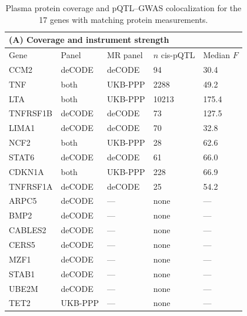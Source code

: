 \begin{table}[htbp]
\centering
\caption{Plasma protein coverage and pQTL--GWAS colocalization for the 17 genes with matching protein measurements.}
\label{tab:pqtl_coverage}
\footnotesize
\begin{tabular}{lllll}
\toprule
\multicolumn{5}{l}{\textbf{(A)} Coverage and instrument strength}\\
\midrule
  Gene & Panel & MR panel & $n$ cis-pQTL & Median $F$ \\
\midrule
  CCM2      & deCODE & deCODE   & 94    & 30.4 \\
  TNF       & both   & UKB-PPP  & 2288  & 49.2 \\
  LTA       & both   & UKB-PPP  & 10213 & 175.4 \\
  TNFRSF1B  & deCODE & deCODE   & 73    & 127.5 \\
  LIMA1     & deCODE & deCODE   & 70    & 32.8 \\
  NCF2      & both   & UKB-PPP  & 28    & 62.6 \\
  STAT6     & deCODE & deCODE   & 61    & 66.0 \\
  CDKN1A    & both   & UKB-PPP  & 228   & 66.9 \\
  TNFRSF1A  & deCODE & deCODE   & 25    & 54.2 \\
  ARPC5     & deCODE & ---      & none  & --- \\
  BMP2      & deCODE & ---      & none  & --- \\
  CABLES2   & deCODE & ---      & none  & --- \\
  CERS5     & deCODE & ---      & none  & --- \\
  MZF1      & deCODE & ---      & none  & --- \\
  STAB1     & deCODE & ---      & none  & --- \\
  UBE2M     & deCODE & ---      & none  & --- \\
  TET2      & UKB-PPP & ---     & none  & --- \\
\bottomrule
\end{tabular}

\vspace{1.4em}


\end{table}
